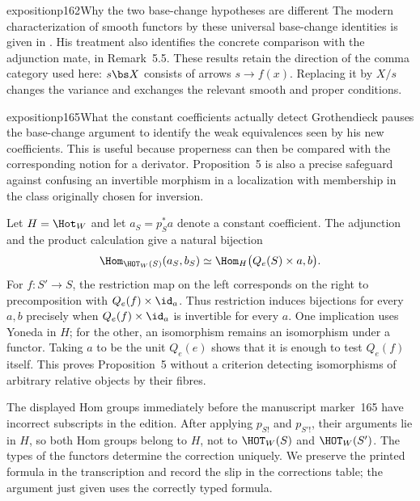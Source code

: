 \begin{dcomment}{exposition}{p162}{Why the two base-change hypotheses are different}
The modern characterization of smooth functors by these universal base-change identities is given in \citet[Theorem~1.2]{Maltsiniotis2005Asphericite}. His treatment also identifies the concrete comparison with the adjunction mate, in Remark~5.5. These results retain the direction of the comma category used here: $s\bs X$ consists of arrows $s\to f(x)$. Replacing it by $X/s$ changes the variance and exchanges the relevant smooth and proper conditions.
\end{dcomment}

\begin{dcomment}{exposition}{p165}{What the constant coefficients actually detect}
Grothendieck pauses the base-change argument to identify the weak equivalences seen by his new coefficients. This is useful because properness can then be compared with the corresponding notion for a derivator. Proposition~5 is also a precise safeguard against confusing an invertible morphism in a localization with membership in the class originally chosen for inversion.

Let $H=\Hot_W$ and let $a_S=p_S^*a$ denote a constant coefficient. The adjunction and the product calculation give a natural bijection
\[
 \Hom_{\HOT_W(S)}(a_S,b_S)
 \simeq\Hom_H\bigl(Q_e(S)\times a,b\bigr).
\]
For $f:S'\to S$, the restriction map on the left corresponds on the right to precomposition with $Q_e(f)\times\id_a$. Thus restriction induces bijections for every $a,b$ precisely when $Q_e(f)\times\id_a$ is invertible for every $a$. One implication uses Yoneda in $H$; for the other, an isomorphism remains an isomorphism under a functor. Taking $a$ to be the unit $Q_e(e)$ shows that it is enough to test $Q_e(f)$ itself. This proves Proposition~5 without a criterion detecting isomorphisms of arbitrary relative objects by their fibres.

The displayed Hom groups immediately before the manuscript marker~165 have incorrect subscripts in the edition. After applying $p_{S!}$ and $p_{S'!}$, their arguments lie in $H$, so both Hom groups belong to $H$, not to $\HOT_W(S)$ and $\HOT_W(S')$. The types of the functors determine the correction uniquely. We preserve the printed formula in the transcription and record the slip in the corrections table; the argument just given uses the correctly typed formula.


\end{dcomment}
